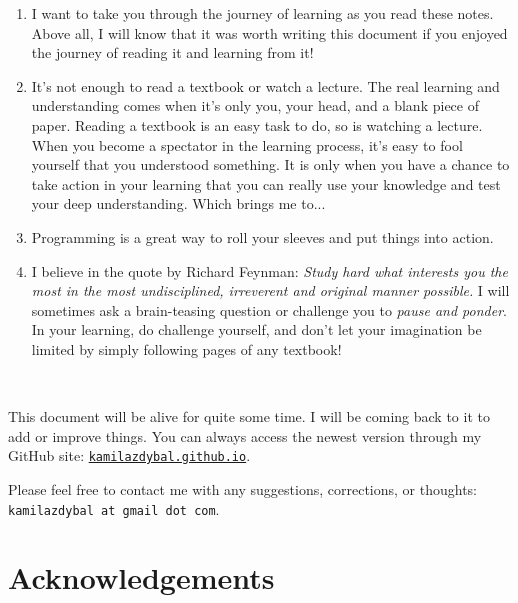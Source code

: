 \documentclass[12pt]{report}
\begin{document}
\begin{enumerate}
\item I want to take you through the journey of learning as you read these notes. Above all, I will know that it was worth writing this document if you enjoyed the journey of reading it and learning from it!

\item It's not enough to read a textbook or watch a lecture. The real learning and understanding comes when it's only you, your head, and a blank piece of paper. Reading a textbook is an easy task to do, so is watching a lecture. When you become a spectator in the learning process, it's easy to fool yourself that you understood something. It is only when you have a chance to take action in your learning  that you can really use your knowledge and test your deep understanding. Which brings me to...

\item Programming is a great way to roll your sleeves and put things into action.

\item I believe in the quote by Richard Feynman: \textit{Study hard what interests you the most in the most undisciplined, irreverent and original manner possible.} I will sometimes ask a brain-teasing question or challenge you to \textit{pause and ponder}. In your learning, do challenge yourself, and don't let your imagination be limited by simply following pages of any textbook!
\end{enumerate}

\,\,

This document will be alive for quite some time. I will be coming back to it to add or improve things. You can always access the newest version through my GitHub site: \href{https://kamilazdybal.github.io/}{\texttt{kamilazdybal.github.io}}.

Please feel free to contact me with any suggestions, corrections, or thoughts: \verb|kamilazdybal at gmail dot com|.

\newpage
\thispagestyle{empty}
\tableofcontents


\newpage
\chapter*{Acknowledgements}
\thispagestyle{empty}

{\fontsize{12}{12}}
\end{document}
